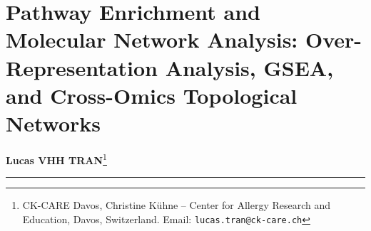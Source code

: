 \documentclass[11pt,oneside]{book}
\begin{document}
\setcounter{chapter}{24} %
\chapter{Pathway Enrichment and Molecular Network Analysis: Over-Representation Analysis, GSEA, and Cross-Omics Topological Networks}
\label{ch:pathway_network}

\noindent
\textbf{Lucas VHH TRAN}\footnote{CK-CARE Davos, Christine K\"uhne -- Center for Allergy Research and Education, Davos, Switzerland. Email: \texttt{lucas.tran@ck-care.ch}}\\
\rule{\textwidth}{0.8pt}

\begin{abstract}
\noindent
High-resolution mass spectrometry experiments frequently culminate in ranked lists of hundreds of differentially abundant peptides, proteins, or metabolites. However, an uncurated feature list does not provide mechanistic clarity: cellular phenotype is mediated not by isolated molecules, but by coordinated fluxes through metabolic cascades, multi-protein complexes, and signaling cascades. Bridging physical mass spectra to biological insight requires functional enrichment and molecular network analysis. 

This chapter establishes the statistical, topological, and computational foundations for pathway-level inference in proteomics and metabolomics. We develop the mathematical framework of Over-Representation Analysis (ORA) via the hypergeometric distribution, Fisher's exact test, and non-central Wallenius formulations, deriving an analytical proof demonstrating why using the whole genome rather than the empirically detected mass spectrometry background creates massive false-positive inflation. We formalize functional class scoring via Gene Set Enrichment Analysis (GSEA), deriving the weighted Kolmogorov-Smirnov running-sum statistic, normalized enrichment score (NES), and permutation testing. We then transition to graph-theoretic network biology, formalizing adjacency matrices, degree and betweenness centrality, random walk with restart (RWR), Signaling Pathway Impact Analysis (SPIA), and Louvain community detection. Finally, we formulate bipartite cross-omics network integration between proteomics and metabolomics, supported by a tutor diagnostic heuristics checklist, an end-to-end reproducible R laboratory, a review of the ``Five Deadly Sins'' of omics pathway analysis, and multi-tier exercises with complete worked solutions.
\end{abstract}
\end{document}

